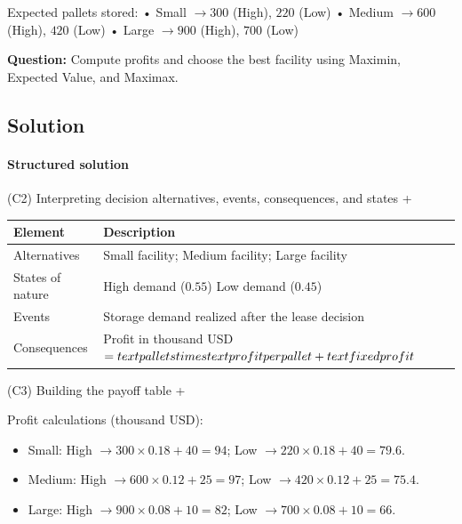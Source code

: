 \documentclass[11pt]{article}
\begin{document}
	
	
	
	
	
	Expected pallets stored:
	• Small $\to 300$ (High), $220$ (Low)
	• Medium $\to 600$ (High), $420$ (Low)
	• Large $\to 900$ (High), $700$ (Low)
	
	
	
	
	
	\textbf{Question:} Compute profits and choose the best facility using Maximin, Expected Value, and Maximax.
	
	\subsection*{Solution}
	
	\hypertarget{problem8-solution}{}
	
	\paragraph{Structured solution}
	
	
	(C2) Interpreting decision alternatives, events, consequences, and states
	+
	
	
	\begin{center}
		\begin{tabular}{ll}
			\toprule
			Element & Description \\
			\midrule
			Alternatives & Small facility; Medium facility; Large facility \\
			States of nature & High demand
			($0.55$)
			Low demand
			($0.45$) \\
			Events & Storage demand realized after the lease decision \\
			Consequences & Profit in thousand USD $= \\text{pallets} \\times \\text{profit per pallet} + \\text{fixed profit}$ \\
			\bottomrule
		\end{tabular}
	\end{center}
	
	
	
	
	
	
	(C3) Building the payoff table
	+
	
	
	Profit calculations (thousand USD):
	\begin{itemize}
		\item Small: High $\to 300 \times 0.18 + 40 = 94$; Low $\to 220 \times 0.18 + 40 = 79.6$.
		\item Medium: High $\to 600 \times 0.12 + 25 = 97$; Low $\to 420 \times 0.12 + 25 = 75.4$.
		\item Large: High $\to 900 \times 0.08 + 10 = 82$; Low $\to 700 \times 0.08 + 10 = 66$.
	\end{itemize}
	
\end{document}
